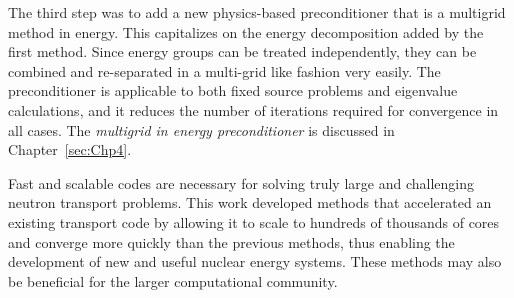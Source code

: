 The third step was to add a new physics-based preconditioner that is a multigrid method in energy. This capitalizes on the energy decomposition added by the first method. Since energy groups can be treated independently, they can be combined and re-separated in a multi-grid like fashion very easily. The preconditioner is applicable to both fixed source problems and eigenvalue calculations, and it reduces the number of iterations required for convergence in all cases. The \emph{multigrid in energy preconditioner} is discussed in Chapter~\ref{sec:Chp4}.

Fast and scalable codes are necessary for solving truly large and challenging neutron transport problems. This work developed methods that accelerated an existing transport code by allowing it to scale to hundreds of thousands of cores and converge more quickly than the previous methods, thus enabling the development of new and useful nuclear energy systems. These methods may also be beneficial for the larger computational community.

\separatorpage{}  
